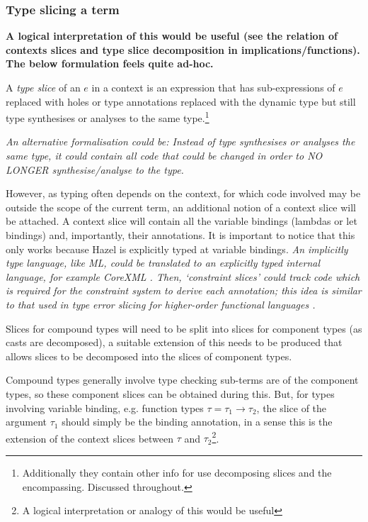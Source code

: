 \subsubsection{Type slicing a term}
\textbf{A logical interpretation of this would be useful (see the relation of contexts slices and type slice decomposition in implications/functions). The below formulation feels quite ad-hoc.}
\par
A \textit{type slice} of an $e$ in a context is an expression that has sub-expressions of $e$ replaced with holes or type annotations replaced with the dynamic type but still type synthesises or analyses to the same type.\footnote{Additionally they contain other info for use decomposing slices and the encompassing. Discussed throughout.}\par 
\textit{An alternative formalisation could be: Instead of type synthesises or analyses the same type, it could contain all code that could be changed in order to NO LONGER synthesise/analyse to the type.}\par
However, as typing often depends on the context, for which code involved may be outside the scope of the current term, an additional notion of a context slice will be attached. A context slice will contain all the variable bindings (lambdas or let bindings) and, importantly, their annotations. It is important to notice that this only works because Hazel is explicitly typed at variable bindings. \textit{An implicitly type language, like ML, could be translated to an explicitly typed internal language, for example CoreXML \cite{CoreXML}. Then, `constraint slices' could track code which is required for the constraint system to derive each annotation; this idea is similar to that used in type error slicing for higher-order functional languages \cite{ErrSlice, HaackErrSlice}.}
\par 
Slices for compound types will need to be split into slices for component types (as casts are decomposed), a suitable extension of this needs to be produced that allows slices to be decomposed into the slices of component types.\par
Compound types generally involve type checking sub-terms are of the component types, so these component slices can be obtained during this. But,
for types involving variable binding, e.g. function types $\tau = \tau_1 \to \tau_2$, the slice of the argument $\tau_1$ should simply be the binding annotation, in a sense this is the extension of the context slices between $\tau$ and $\tau_2$\footnote{A logical interpretation or analogy of this would be useful}.\\ \par 

